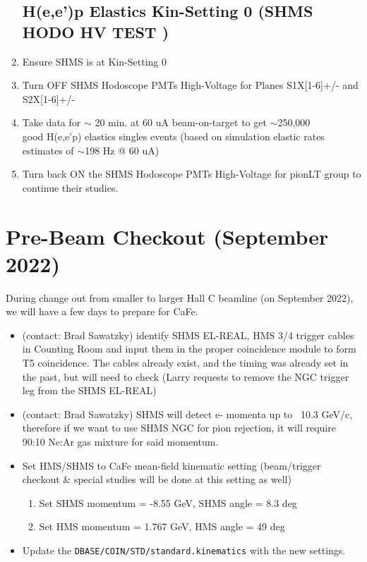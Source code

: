 \documentclass{article}
\begin{document}
  \begin{enumerate}
    \subsection*{H(e,e')p Elastics Kin-Setting 0 (SHMS HODO HV TEST )}
    \item Ensure SHMS is   at Kin-Setting 0
    \item Turn OFF SHMS Hodoscope PMTs High-Voltage for Planes S1X[1-6]+/- and S2X[1-6]+/- 
    \item Take data for $\sim$ 20  min. at 60 uA beam-on-target to get $\sim$250,000 \\
     good H(e,e'p) elastics singles events (based on simulation elastic rates estimates of $\sim$198 Hz @ 60 uA)
     \item  Turn back ON the SHMS Hodoscope PMTs High-Voltage for pionLT group to continue their studies.
    \end{enumerate}

    


\section{Pre-Beam Checkout (September 2022)}
 During change out from smaller to larger Hall C beamline (on September 2022), we will have a few days to prepare for CaFe.
 \begin{itemize}
 \item (contact: Brad Sawatzky) identify SHMS EL-REAL, HMS 3/4 trigger cables in Counting Room and input them
 in the proper coincidence module to form T5 coincidence. The cables already
 exist, and the timing was already set in the past, but will need to check
 (Larry requests to remove the NGC trigger leg from the SHMS EL-REAL)

\item (contact: Brad Sawatzky) SHMS will detect e- momenta up to ~10.3 GeV/c, therefore if we want to use SHMS NGC for pion rejection, it will require ~ 90:10 Ne:Ar gas mixture for said momentum.

\item Set HMS/SHMS to CaFe mean-field kinematic setting (beam/trigger checkout \& special studies will be done at this setting as well) 

    \begin{enumerate}
    \item Set SHMS momentum = -8.55 GeV, SHMS angle = 8.3 deg  
    \item Set HMS momentum = 1.767 GeV, HMS angle = 49 deg
    \end{enumerate}
 
 \item Update the \texttt{DBASE/COIN/STD/standard.kinematics} with the new settings.
 
 \end{itemize}
\end{document}
